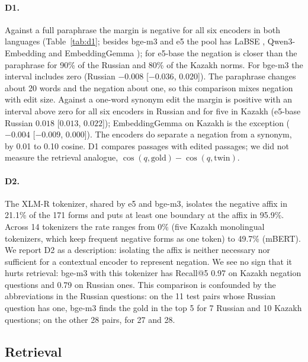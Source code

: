 \documentclass[11pt]{article}
\begin{document}
\paragraph{D1.} Against a full paraphrase the margin is negative for all six encoders in both languages
(Table~\ref{tab:d1}; besides bge-m3 and e5 the pool has LaBSE \citep{feng-etal-2022-language}, Qwen3-Embedding
\citep{zhang2025qwen3} and EmbeddingGemma \citep{vera2025embeddinggemma}); for e5-base the negation is closer than the paraphrase for 90\% of the Russian and
80\% of the Kazakh norms. For bge-m3 the interval includes zero (Russian $-0.008$ [$-0.036$, $0.020$]). The
paraphrase changes about 20 words and the negation about one, so this comparison mixes negation with edit
size. Against a one-word synonym edit the margin is positive with an interval above zero for all six encoders
in Russian and for five in Kazakh (e5-base Russian $0.018$ [$0.013$, $0.022$]); EmbeddingGemma on Kazakh is the
exception ($-0.004$ [$-0.009$, $0.000$]). The encoders do separate a negation from a synonym, by 0.01 to 0.10
cosine. D1 compares passages with edited passages; we did not measure the retrieval analogue,
$\cos(q, \mathrm{gold}) - \cos(q, \mathrm{twin})$.

\paragraph{D2.} The XLM-R tokenizer, shared by e5 and bge-m3, isolates the negative affix in 21.1\% of the
171 forms and puts at least one boundary at the affix in 95.9\%. Across 14 tokenizers the rate ranges from
0\% (five Kazakh monolingual tokenizers, which keep frequent negative forms as one token) to 49.7\% (mBERT).
We report D2 as a description: isolating the affix is neither necessary nor sufficient for a contextual
encoder to represent negation. We see no sign that it hurts retrieval: bge-m3 with this tokenizer has
Recall@5 0.97 on Kazakh negation questions and 0.79 on Russian ones. This comparison is confounded by the
abbreviations in the Russian questions: on the 11 test pairs whose Russian question has one, bge-m3 finds the
gold in the top 5 for 7 Russian and 10 Kazakh questions; on the other 28 pairs, for 27 and 28.

\subsection{Retrieval}
\end{document}
